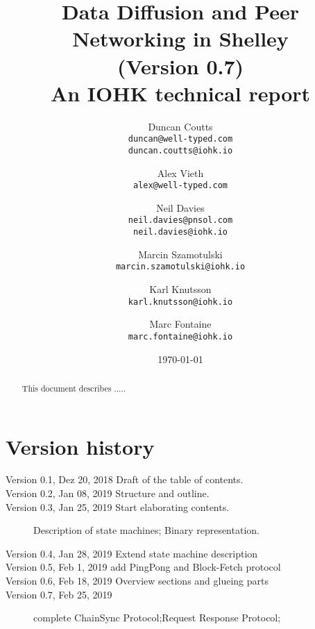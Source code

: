 \documentclass{report}
\theoremstyle{definition}{
  \newtheorem{lemma}{Lemma}[section] %
  \newtheorem{definition}[lemma]{Definition}
}
\theoremstyle{theorem}{
  \newtheorem{invariant}[lemma]{Invariant}
  \newtheorem{proofobligation}[lemma]{Proof Obligation}
}
\numberwithin{equation}{lemma}
\begin{document}
\title{Data Diffusion and Peer Networking in Shelley\\
       {\small (Version 0.7)} \\
       {\large \sc An IOHK technical report}}
\author{Duncan Coutts \\ {\small \texttt{duncan@well-typed.com}} \\
                         {\small \texttt{duncan.coutts@iohk.io}}
   \and Alex Vieth \\ {\small \texttt{alex@well-typed.com}}
   \and Neil Davies \\ {\small \texttt{neil.davies@pnsol.com}} \\
                       {\small \texttt{neil.davies@iohk.io}}
   \and Marcin Szamotulski \\ {\small \texttt{marcin.szamotulski@iohk.io}}
   \and Karl Knutsson \\ {\small \texttt{karl.knutsson@iohk.io}}
   \and Marc Fontaine \\ {\small \texttt{marc.fontaine@iohk.io}}
   }
\date{\today}

\maketitle

\begin{abstract}
  This document describes .....
\end{abstract}

\tableofcontents

\section*{Version history}

\begin{description}
\item[Version 0.1, Dez 20, 2018  Draft of the table of contents.]
\item[Version 0.2, Jan 08, 2019 Structure and outline.]
\item[Version 0.3, Jan 25, 2019 Start elaborating contents.]
  Description of state machines; Binary representation.
\item[Version 0.4, Jan 28, 2019 Extend state machine description]
\item[Version 0.5, Feb 1,  2019  add PingPong and Block-Fetch protocol]
\item[Version 0.6, Feb 18, 2019  Overview sections and glueing parts]
\item[Version 0.7, Feb 25, 2019 ]
  complete ChainSync Protocol;Request Response Protocol;
\end{description}
\end{document}
